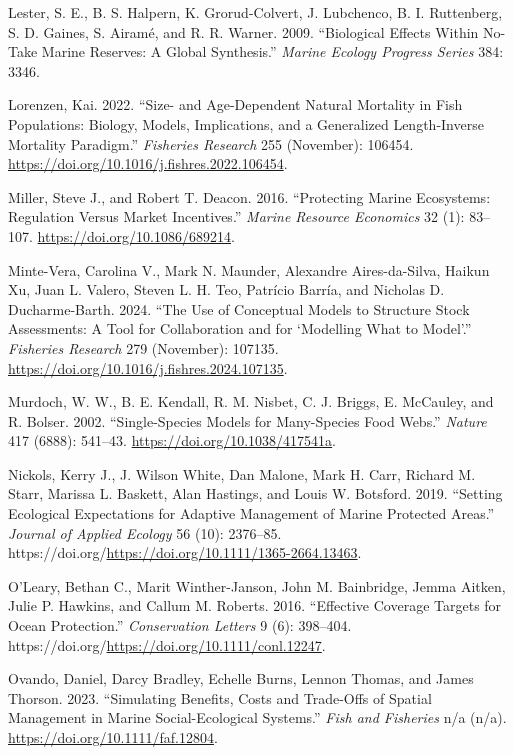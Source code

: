 \documentclass[
  default,
  lineno,
  referee]{sn-jnl}
\newlength{\cslhangindent}
\newenvironment{CSLReferences}[2] %
 {\begin{list}{}{%
  \setlength{\itemindent}{0pt}
  \setlength{\leftmargin}{0pt}
  \setlength{\parsep}{0pt}
  \ifodd #1
   \setlength{\leftmargin}{\cslhangindent}
   \setlength{\itemindent}{-1\cslhangindent}
  \fi
  \setlength{\itemsep}{#2\baselineskip}}}
 {\end{list}}
\begin{document}
\begin{CSLReferences}{1}{0}
Lester, S. E., B. S. Halpern, K. Grorud-Colvert, J. Lubchenco, B. I.
Ruttenberg, S. D. Gaines, S. Airamé, and R. R. Warner. 2009.
{``Biological Effects Within No-Take Marine Reserves: A Global
Synthesis.''} \emph{Marine Ecology Progress Series} 384: 3346.

Lorenzen, Kai. 2022. {``Size- and Age-Dependent Natural Mortality in
Fish Populations: Biology, Models, Implications, and a Generalized
Length-Inverse Mortality Paradigm.''} \emph{Fisheries Research} 255
(November): 106454. \url{https://doi.org/10.1016/j.fishres.2022.106454}.

Miller, Steve J., and Robert T. Deacon. 2016. {``Protecting Marine
Ecosystems: Regulation Versus Market Incentives.''} \emph{Marine
Resource Economics} 32 (1): 83--107.
\url{https://doi.org/10.1086/689214}.

Minte-Vera, Carolina V., Mark N. Maunder, Alexandre Aires-da-Silva,
Haikun Xu, Juan L. Valero, Steven L. H. Teo, Patrício Barría, and
Nicholas D. Ducharme-Barth. 2024. {``The Use of Conceptual Models to
Structure Stock Assessments: A Tool for Collaboration and for
{`Modelling What to Model'}.''} \emph{Fisheries Research} 279
(November): 107135. \url{https://doi.org/10.1016/j.fishres.2024.107135}.

Murdoch, W. W., B. E. Kendall, R. M. Nisbet, C. J. Briggs, E. McCauley,
and R. Bolser. 2002. {``Single-Species Models for Many-Species Food
Webs.''} \emph{Nature} 417 (6888): 541--43.
\url{https://doi.org/10.1038/417541a}.

Nickols, Kerry J., J. Wilson White, Dan Malone, Mark H. Carr, Richard M.
Starr, Marissa L. Baskett, Alan Hastings, and Louis W. Botsford. 2019.
{``Setting Ecological Expectations for Adaptive Management of Marine
Protected Areas.''} \emph{Journal of Applied Ecology} 56 (10): 2376--85.
https://doi.org/\url{https://doi.org/10.1111/1365-2664.13463}.

O'Leary, Bethan C., Marit Winther-Janson, John M. Bainbridge, Jemma
Aitken, Julie P. Hawkins, and Callum M. Roberts. 2016. {``Effective
Coverage Targets for Ocean Protection.''} \emph{Conservation Letters} 9
(6): 398--404. https://doi.org/\url{https://doi.org/10.1111/conl.12247}.

Ovando, Daniel, Darcy Bradley, Echelle Burns, Lennon Thomas, and James
Thorson. 2023. {``Simulating Benefits, Costs and Trade-Offs of Spatial
Management in Marine Social-Ecological Systems.''} \emph{Fish and
Fisheries} n/a (n/a). \url{https://doi.org/10.1111/faf.12804}.


\end{CSLReferences}
\end{document}
